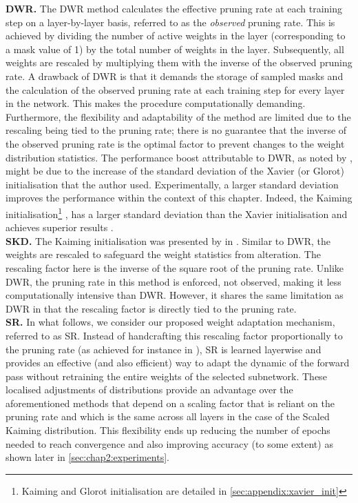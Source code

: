 \noindent\textbf{ \acl{DWR}.} The \ac{DWR} \cite{DBLP:conf/nips/ZhouLLY19}
method calculates the effective pruning rate at each training step on a
layer-by-layer basis, referred to as the \emph{observed} pruning rate. This is
achieved by dividing the number of active weights in the layer (corresponding to
a mask value of 1) by the total number of weights in the layer. Subsequently,
all weights are rescaled by multiplying them with the inverse of the observed
pruning rate. A drawback of \ac{DWR} is that it demands the storage of sampled
masks and the calculation of the observed pruning rate at each training step for
every layer in the network. This makes the procedure computationally demanding.
Furthermore, the flexibility and adaptability of the method are limited due to
the rescaling being tied to the pruning rate; there is no guarantee that the
inverse of the observed pruning rate is the optimal factor to prevent changes to
the weight distribution statistics. The performance boost attributable to
\ac{DWR}, as noted by \citeauthor{DBLP:conf/nips/ZhouLLY19}, might be due to the
increase of the standard deviation of the Xavier (or Glorot) initialisation
\cite{glorot2011deep} that the author used. Experimentally, a larger standard
deviation improves the performance within the context of this chapter. Indeed,
the Kaiming initialisation\footnote{Kaiming and Glorot initialisation are
detailed in \cref{sec:appendix:xavier_init}} \cite{DBLP:conf/cvpr/HeZRS16}, has
a larger standard deviation than the Xavier initialisation and achieves superior
results
\cite{DBLP:conf/cvpr/RamanujanWKFR20,DBLP:journals/corr/abs-2202-12002}.\\

\noindent\textbf{\acl{SKD}.} The Kaiming initialisation
\cite{DBLP:conf/cvpr/HeZRS16} was presented by
\citeauthor{DBLP:conf/cvpr/RamanujanWKFR20} in
\cite{DBLP:conf/cvpr/RamanujanWKFR20}. Similar to \ac{DWR}, the weights are
rescaled to safeguard the weight statistics from alteration. The rescaling
factor here is the inverse of the square root of the pruning rate. Unlike
\ac{DWR}, the pruning rate in this method is enforced, not observed, making it
less computationally intensive than \ac{DWR}. However, it shares the same
limitation as \ac{DWR} in that the rescaling factor is directly tied to the
pruning rate.\\

\noindent\textbf{\acl{SR}.} In what follows, we consider our proposed weight
adaptation mechanism, referred to as \acf{SR}. Instead of handcrafting this
rescaling factor proportionally to the pruning rate (as achieved for instance in
\cite{DBLP:conf/nips/ZhouLLY19}), \ac{SR} is learned layerwise and provides an
effective (and also efficient) way to adapt the dynamic of the forward pass
without retraining the entire weights of the selected subnetwork. These
localised adjustments of distributions provide an advantage over the
aforementioned methods that depend on a scaling factor that is reliant on the
pruning rate and which is the same across all layers in the case of the Scaled
Kaiming distribution. This flexibility ends up reducing the number of epochs
needed to reach convergence and also improving accuracy (to some extent) as
shown later in \cref{sec:chap2:experiments}.\\

